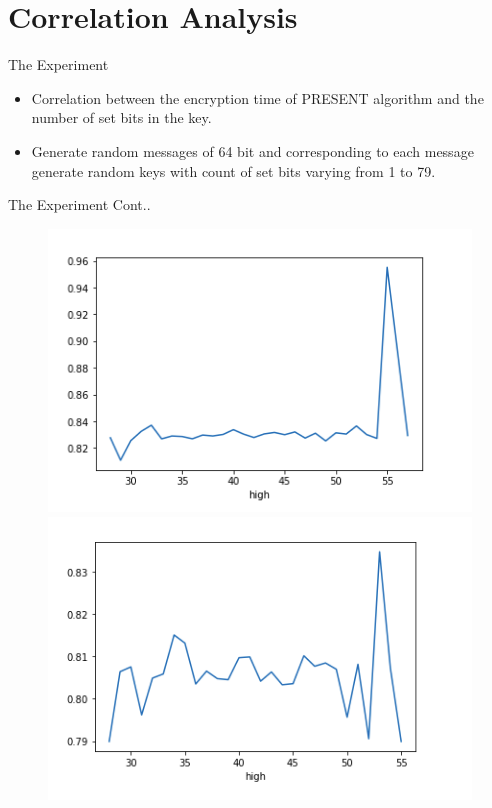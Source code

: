 \section{Correlation Analysis}
\begin{frame}{The Experiment}
\begin{itemize}
    \item Correlation between the encryption time of PRESENT algorithm and the number of set bits in the key.
    \item Generate random messages of 64 bit and corresponding to each message generate random keys with count of set bits varying from 1 to 79.
\end{itemize}
\end{frame}
\begin{frame}{The Experiment Cont..}
\begin{center}
        \begin{figure}[h!]
              \includegraphics[width=0.8\linewidth]{CA1.PNG}
            \endminipage\hfill
              \includegraphics[width=0.8\linewidth]{CA2.PNG}
            \endminipage
        \end{figure}

\end{center}
\end{frame}
